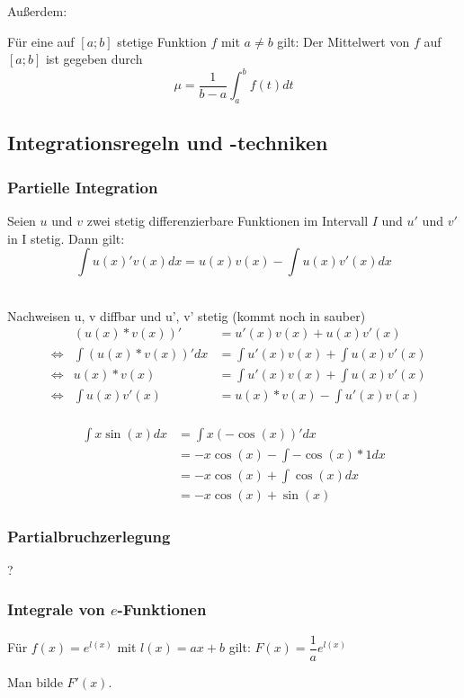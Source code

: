 Außerdem:
\begin{Definition}
  Für eine auf $[a;b]$ stetige Funktion $f$ mit $a \neq b$ gilt: Der Mittelwert von $f$ auf $[a;b]$ ist gegeben durch $$\mu = \dfrac{1}{b-a} \int_a^b f(t)dt$$
\end{Definition}

\subsection{Integrationsregeln und -techniken}

\subsubsection{Partielle Integration}
\begin{Theorem}
  Seien $u$ und $v$ zwei stetig differenzierbare Funktionen im Intervall $I$ und $u'$
  und $v'$ in I stetig. Dann gilt:
  $$\int u(x)'v(x) dx= u(x)v(x) - \int u(x)v'(x) dx$$
\end{Theorem}
\begin{Beweis}\\
Nachweisen u, v diffbar und u', v' stetig (kommt noch in sauber)\\
\begin{align*}
  &&(u(x)*v(x))' &= u'(x)v(x)+u(x)v'(x)\\
  &\Leftrightarrow & \int (u(x)*v(x))' dx &= \int u'(x)v(x)+\int u(x)v'(x)\\
  &\Leftrightarrow & u(x)*v(x) &= \int u'(x)v(x)+\int u(x)v'(x)\\
  &\Leftrightarrow & \int u(x)v'(x) &= u(x)*v(x)- \int u'(x)v(x)\\
\end{align*}
\end{Beweis}
\begin{Beispiel}
  \begin{align*}
  \int x\sin(x) dx &= \int x(-\cos(x))' dx\\
  &= -x\cos(x) - \int-\cos(x)*1 dx\\
  &= -x\cos(x) + \int\cos(x) dx\\
  &= -x\cos(x) + \sin(x)
\end{align*}
\end{Beispiel}

\subsubsection{Partialbruchzerlegung}
?
\subsubsection{Integrale von $e$-Funktionen}
\begin{Theorem}
  Für $f(x)=e^{l(x)}$ mit $l(x) = ax+b$ gilt: $F(x) = \dfrac{1}{a}e^{l(x)}$
\end{Theorem}
\begin{Beweis}
  Man bilde $F'(x)$.
\end{Beweis}
